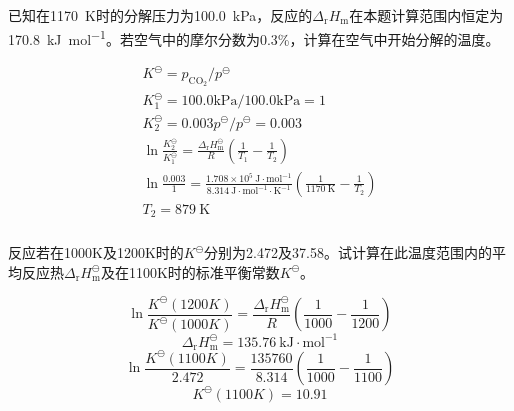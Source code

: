 \begin{frame}[t]
    \frametitle{}

    \begin{example}
        已知在\SI{1170}{K}时的分解压力为\SI{100.0}{kPa}，反应的$\Delta_{\mathrm{r}} H_{\mathrm{m}}$在本题计算范围内恒定为\SI{170.8}{kJ.mol^{-1}}。若空气中的摩尔分数为0.3\%，计算在空气中开始分解的温度。
    \end{example}
    \pause
    $$\begin{array}{c}
        K^{\ominus}=p_{\mathrm{CO}_{2}} / p^{\ominus} \\
        K_{1}^{\ominus}=100.0 \mathrm{kPa} / 100.0 \mathrm{kPa}=1 \\
        K_{2}^{\ominus}=0.003 p^{\ominus} / p^{\ominus}=0.003 \\
        \ln \frac{K_{2}^{\ominus}}{K_{1}^{\ominus}}=\frac{\Delta_{\mathrm{r}} H_{\mathrm{m}}^{\ominus}}{R}\left(\frac{1}{T_{1}}-\frac{1}{T_{2}}\right) \\
        \ln \frac{0.003}{1}=\frac{1.708 \times 10^{5} \mathrm{~J} \cdot \mathrm{mol}^{-1}}{8.314 \mathrm{~J} \cdot \mathrm{mol}^{-1} \cdot \mathrm{K}^{-1}}\left(\frac{1}{1170 \mathrm{~K}}-\frac{1}{T_{2}}\right) \\
        T_{2}=879 \mathrm{~K}
        \end{array}$$

\end{frame}


\begin{frame}[t]
    \frametitle{}

    \begin{example}
        反应若在1000K及1200K时的$K^{\ominus}$分别为2.472及37.58。试计算在此温度范围内的平均反应热$\Delta_{\mathrm{r}} H_{\mathrm{m}}^\ominus$及在1100K时的标准平衡常数$K^{\ominus}$。
    \end{example}
    \pause
    \[
        \ln \frac{K^{\ominus}(1200 K)}{K^{\ominus}(1000 K)}=\frac{\Delta_{\mathrm{r}} H_{\mathrm{m}}^\ominus}{R}\left(\frac{1}{1000}-\frac{1}{1200}\right)
    \]
    \[
        \Delta_{\mathrm{r}} H_{\mathrm{m}}^\ominus=135.76 \mathrm{~kJ} \cdot \mathrm{mol}^{-1}
    \]
    \[
        \ln \frac{K^{\ominus}(1100 K)}{2.472}=\frac{135760}{8.314}\left(\frac{1}{1000}-\frac{1}{1100}\right)
    \]
    \[
        K^{\ominus}(1100 K)=10.91
    \]

\end{frame}